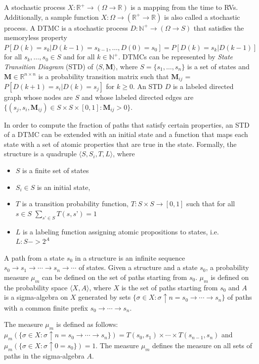 \documentclass[
graybox,
envcountchap
]{svmult}
\begin{document}
\begin{bibunit}
A stochastic process $X:\mathbb{R}^+\rightarrow(\Omega\rightarrow\mathbb{R})$ is a mapping from the time to RVs. Additionally, a sample function $X:\Omega\rightarrow(\mathbb{R}^+\rightarrow\mathbb{R})$ is also called a stochastic process. A DTMC is a stochastic process $D:\mathbb{N}^+\rightarrow(\Omega\rightarrow S)$ that satisfies the memoryless property $P[D(k)=s_k|D(k-1)=s_{k-1},\ldots,D(0)=s_0]=P[D(k)=s_k|D(k-1)]$ for all $s_k,\ldots,s_0\in S$ and for all $k\in\mathbb{N}^+$. DTMCs can be represented by {\em State Transition Diagram} (STD) of $\langle S,\mathbf{M}\rangle$, where $S=\{s_1,\ldots,s_n\}$ is a set of states and $\mathbf{M}\in\mathbb{R}^{n\times n}$ is a probability transition matrix such that $\mathbf{M}_{ij}$ = $P[D(k+1)=s_i|D(k)=s_j]$ for $k\geq 0$. An STD $D$ is a labeled directed graph whose nodes are $S$ and whose labeled directed edges are $\{(s_j, s_i, \mathbf{M}_{ij})\in S\times S\times [0,1]: \mathbf{M}_{ij} > 0\}$.


In order to compute the fraction of paths that satisfy certain properties, an STD of a DTMC can be extended with an initial state and a function that maps each state with a set of atomic properties that are true in the state. Formally, the structure is a quadruple $\langle S, S_i, T, L\rangle$, where
\begin{itemize}
\item $S$ is a finite set of states
\item $S_i\in S$ is an initial state,
\item $T$ is a transition probability function, $T: S\times S \rightarrow [0,1]$ such that for all $s\in S$
$\sum_{s’\in S} T(s,s’) = 1$
\item $L$ is a labeling function assigning atomic propositions to states, i.e. $L: S->2^A$
\end{itemize}


A path from a state $s_0$ in a structure is an infinite sequence
$s_0 \rightarrow s_1 \rightarrow \cdots \rightarrow s_n \rightarrow\cdots$ of states. Given a structure and a state $s_0$, a probability measure $\mu_m$ can be defined on the set of paths starting from $s_0$. $\mu_m$ is defined on the probability space $\langle X, A\rangle$, where $X$ is the set of paths starting from $s_0$ and $A$ is a sigma-algebra on $X$ generated by sets $\{\sigma \in X: \sigma\uparrow n = s_0 \rightarrow\cdots\rightarrow s_n\}$ of paths with a common finite prefix $s_0\rightarrow\cdots\rightarrow s_n$.

The measure $\mu_m$ is defined as follows:
$\mu_m(\{\sigma \in X: \sigma\uparrow n = s_0 \rightarrow\cdots\rightarrow s_n\}) = 
T(s_0,s_1)\times\cdots\times T(s_{n-1},s_n)$ and $\mu_m(\{\sigma \in X: \sigma\uparrow 0 = s_0\}) = 1$. The measure $\mu_m$ defines the measure on all sets of paths in the sigma-algebra $A$.



\end{bibunit}
\end{document}
